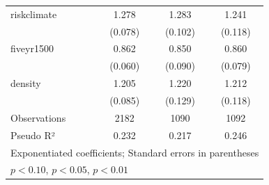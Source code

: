 \begin{table}[htbp]
\begin{tabular}{l*{3}{c}}
\addlinespace
riskclimate &       1.278\sym{***}&       1.283\sym{***}&       1.241\sym{**} \\
            &     (0.078)         &     (0.102)         &     (0.118)         \\
\addlinespace
fiveyr1500  &       0.862\sym{**} &       0.850         &       0.860\sym{*}  \\
            &     (0.060)         &     (0.090)         &     (0.079)         \\
\addlinespace
density     &       1.205\sym{***}&       1.220\sym{*}  &       1.212\sym{**} \\
            &     (0.085)         &     (0.129)         &     (0.118)         \\
\midrule
Observations&        2182         &        1090         &        1092         \\
Pseudo R²  &       0.232         &       0.217         &       0.246         \\
\bottomrule
\multicolumn{4}{l}{\footnotesize Exponentiated coefficients; Standard errors in parentheses}\\
\multicolumn{4}{l}{\footnotesize \sym{*} \(p<0.10\), \sym{**} \(p<0.05\), \sym{***} \(p<0.01\)}\\
\end{tabular}
\end{table}
